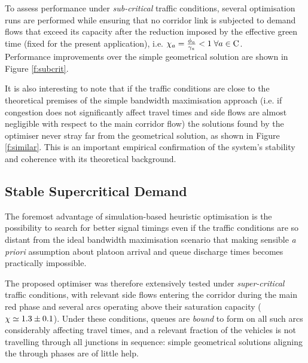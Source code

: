 To assess performance under \emph{sub-critical} traffic conditions, several optimisation runs are performed while ensuring that no corridor link is subjected to demand flows that exceed its capacity after the reduction imposed by the effective green time (fixed for the present application), i.e. $\chi_{a} = \frac{\phi_a}{\gamma_a} < 1 \; \forall a \in \mathrm{C}$.\\

Performance improvements over the simple geometrical solution are shown in Figure \ref{f:subcrit}. 


It is also interesting to note that if the traffic conditions are close to the theoretical premises of the simple bandwidth maximisation approach (i.e. if congestion does not significantly affect travel times and side flows are almost negligible with respect to the main corridor flow) the solutions found by the optimiser never stray far from the geometrical solution, as shown in Figure \ref{f:similar}. This is an important empirical confirmation 
of the system's stability and coherence with its theoretical background. 


\subsection{Stable Supercritical Demand}
The foremost advantage of simulation-based heuristic optimisation is the possibility to search for better signal timings even if the traffic conditions are so distant from the ideal bandwidth maximisation scenario that making sensible \emph{a priori} assumption about platoon arrival and queue discharge times becomes practically impossible.

The proposed optimiser was therefore extensively tested under \emph{super-critical} traffic conditions, with relevant side flows entering the corridor during the main red phase and several arcs operating above their saturation capacity ($\chi \simeq 1.3 \pm 0.1$). Under these conditions, queues are \emph{bound} to form on all such arcs considerably affecting travel times, and a relevant fraction of the vehicles is not travelling through all junctions in sequence: simple geometrical solutions aligning the through phases are of little help.

